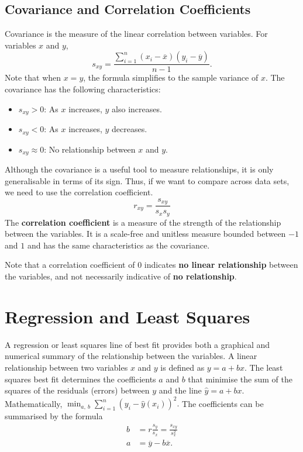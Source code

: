 \documentclass{article}
\begin{document}
\begin{multicols}{3}
\subsection{Covariance and Correlation Coefficients}
Covariance is the measure of the linear correlation between variables.
For variables \(x\) and \(y\),
\begin{equation*}
    s_{xy} = \frac{\sum_{i = 1}^n \left( x_i - \overline{x} \right) \left( y_i - \overline{y} \right)}{n - 1}.
\end{equation*}
Note that when \(x = y\), the formula simplifies to the sample variance of \(x\).
The covariance has the following characteristics:
\begin{itemize}
    \item \(s_{xy} > 0\): As \(x\) increases, \(y\) also increases.
    \item \(s_{xy} < 0\): As \(x\) increases, \(y\) decreases.
    \item \(s_{xy} \approx 0\): No relationship between \(x\) and \(y\).
\end{itemize}
Although the covariance is a useful tool to measure relationships, it is
only generalisable in terms of its sign. Thus, if we want to compare across
data sets, we need to use the correlation coefficient.
\begin{equation*}
    r_{xy} = \frac{s_{xy}}{s_x s_y}
\end{equation*}
The \textbf{correlation coefficient} is a measure of the strength of the relationship between the variables.
It is a scale-free and unitless measure bounded between \(-1\) and \(1\) and
has the same characteristics as the covariance.

Note that a correlation coefficient of \(0\)
indicates \textbf{no linear relationship} between the variables, and not necessarily indicative of \textbf{no relationship}.
\section{Regression and Least Squares}
A regression or least squares line of
best fit provides both a graphical and numerical summary of the relationship between the variables.
A linear relationship between two variables \(x\) and \(y\) is defined as
\(
    y = a + b x.
    \)
The least squares best fit determines the coefficients \(a\) and \(b\) that minimise the sum of the squares of the residuals
(errors) between \(y\) and the line \(\hat{y} = a + b x\). Mathematically,
\(
    \min_{a,\: b} \sum_{i = 1}^n \left( y_i - \hat{y}\left( x_i \right) \right)^2.
    \)
The coefficients can be summarised by the formula
\begin{align*}
    b & = r \frac{s_y}{s_x} = \frac{s_{xy}}{s_x^2} \\
    a & = \overline{y} - b \overline{x}.
\end{align*}



\end{multicols}
\end{document}
